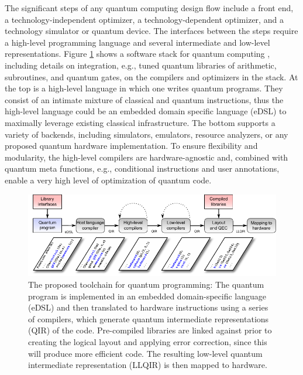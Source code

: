 \documentclass[journal]{IEEEtran}
\begin{document}
The significant steps of any quantum computing design flow \cite{svore2006layered} include a front end, a technology-independent optimizer, a technology-dependent optimizer, and a technology simulator or quantum device.  The interfaces between the steps require a high-level programming language and several intermediate and low-level representations.
Figure \ref{fig:toolchain} shows a software stack for quantum computing \cite{stack}, including details on integration, e.g., tuned quantum libraries of arithmetic, subroutines, and quantum gates, on the compilers and optimizers in the stack.
At the top is a high-level language in which one writes quantum programs.
They consist of an intimate mixture of classical and quantum instructions, thus the high-level language could be an embedded domain specific language (eDSL) to maximally leverage existing classical infrastructure.
The bottom supports a variety of backends, including simulators, emulators, resource analyzers, or any proposed quantum hardware implementation.
To ensure flexibility and modularity, the high-level compilers are hardware-agnostic and, combined with quantum meta functions, e.g., conditional instructions and user annotations, enable a very high level of optimization of quantum code.


\begin{figure}[t]
\centering
\includegraphics[width=\textwidth]{figures/coarse_toolchain}
\caption{The proposed toolchain for quantum programming: The quantum program is implemented in an embedded domain-specific language (eDSL) and then translated to hardware instructions using a series of compilers, which generate quantum intermediate representations (QIR) of the code. Pre-compiled libraries are linked against prior to creating the logical layout and applying error correction, since this will produce more efficient code. The resulting low-level quantum intermediate representation (LLQIR) is then mapped to hardware.}
\label{fig:toolchain}
\end{figure}
\end{document}
